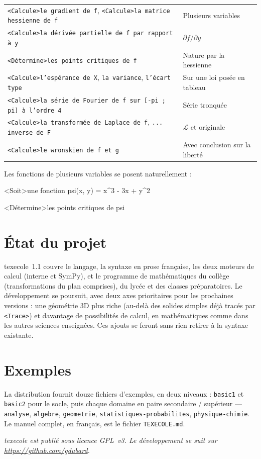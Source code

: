\documentclass[11pt,a4paper]{article}
\newcommand{\bal}[1]{\texttt{#1}}
\begin{document}
\begin{longtable}{@{}ll@{}}
\bal{<Calcule>le gradient de f}, \bal{<Calcule>la matrice hessienne de f} & Plusieurs variables \\
\bal{<Calcule>la dérivée partielle de f par rapport à y} & $\partial f/\partial y$ \\
\bal{<Détermine>les points critiques de f} & Nature par la hessienne \\
\bal{<Calcule>l'espérance de X}, \bal{la variance}, \bal{l'écart type} & Sur une loi posée en tableau \\
\bal{<Calcule>la série de Fourier de f sur [-pi ; pi] à l'ordre 4} & Série tronquée \\
\bal{<Calcule>la transformée de Laplace de f}, \bal{... inverse de F} & $\mathcal{L}$ et originale \\
\bal{<Calcule>le wronskien de f et g} & Avec conclusion sur la liberté \\
\bottomrule
\end{longtable}

Les fonctions de plusieurs variables se posent naturellement :

\begin{code}
<Soit>une fonction psi(x, y) = x^3 - 3x + y^2

<Détermine>les points critiques de psi
\end{code}

\section{État du projet}

texecole~1.1 couvre le langage, la syntaxe en prose française, les
deux moteurs de calcul (interne et SymPy), et le programme de
mathématiques du collège (transformations du plan comprises), du
lycée et des classes préparatoires. Le
développement se poursuit, avec deux axes prioritaires pour les
prochaines versions : une géométrie 3D plus riche (au-delà des
solides simples déjà tracés par \bal{<Trace>}) et davantage de
possibilités de calcul, en mathématiques comme dans les autres
sciences enseignées. Ces ajouts se feront sans rien retirer à la
syntaxe existante.

\section{Exemples}

La distribution fournit douze fichiers d'exemples, en deux niveaux :
\texttt{basic1} et \texttt{basic2} pour le socle, puis chaque domaine
en paire secondaire / supérieur --- \texttt{analyse}, \texttt{algebre},
\texttt{geometrie}, \texttt{statistiques-probabilites},
\texttt{physique-chimie}. Le manuel complet, en français, est le
fichier \texttt{TEXECOLE.md}.

\vfill
{\small\itshape texecole est publié sous licence GPL~v3. Le
développement se suit sur \url{https://github.com/gdubard}.\par}
\end{document}
